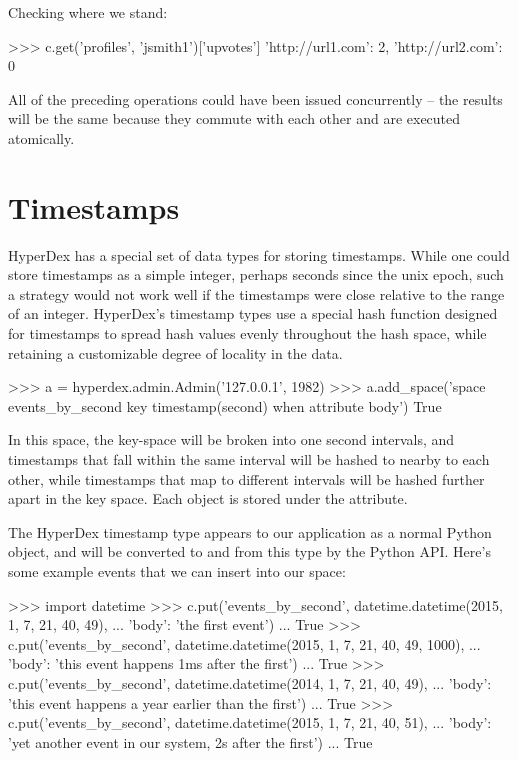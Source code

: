 Checking where we stand:

\begin{pythoncode}
>>> c.get('profiles', 'jsmith1')['upvotes']
{'http://url1.com': 2, 'http://url2.com': 0}
\end{pythoncode}

All of the preceding operations could have been issued concurrently -- the
results will be the same because they commute with each other and are executed
atomically.

\section{Timestamps}

HyperDex has a special set of data types for storing timestamps.  While one
could store timestamps as a simple integer, perhaps seconds since the unix
epoch, such a strategy would not work well if the timestamps were close relative
to the range of an integer.  HyperDex's timestamp types use a special hash
function designed for timestamps to spread hash values evenly throughout the
hash space, while retaining a customizable degree of locality in the data.

\begin{pythoncode}
>>> a = hyperdex.admin.Admin('127.0.0.1', 1982)
>>> a.add_space('space events_by_second key timestamp(second) when attribute body')
True
\end{pythoncode}

In this space, the key-space will be broken into one second intervals, and
timestamps that fall within the same interval will be hashed to nearby to each
other, while timestamps that map to different intervals will be hashed further
apart in the key space.  Each object is stored under the  attribute.

The HyperDex timestamp type appears to our application as a normal Python
 object, and will be converted to and from this type by
the Python API.  Here's some example events that we can insert into our space:

\begin{pythoncode}
>>> import datetime
>>> c.put('events_by_second', datetime.datetime(2015, 1, 7, 21, 40, 49),
...       {'body': 'the first event'})
...
True
>>> c.put('events_by_second', datetime.datetime(2015, 1, 7, 21, 40, 49, 1000),
...       {'body': 'this event happens 1ms after the first'})
...
True
>>> c.put('events_by_second', datetime.datetime(2014, 1, 7, 21, 40, 49),
...       {'body': 'this event happens a year earlier than the first'})
...
True
>>> c.put('events_by_second', datetime.datetime(2015, 1, 7, 21, 40, 51),
...       {'body': 'yet another event in our system, 2s after the first'})
...
True
\end{pythoncode}

